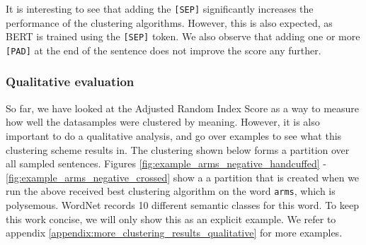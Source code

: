 \documentclass[a4paper,12pt,oneside,openright]{report}
\begin{document}
It is interesting to see that adding the \Verb#[SEP]# significantly increases the performance of the clustering algorithms.
However, this is also expected, as BERT is trained using the \Verb#[SEP]# token.
We also observe that adding one or more \Verb#[PAD]# at the end of the sentence does not improve the score any further. \\

\subsubsection{Qualitative evaluation}

So far, we have looked at the Adjusted Random Index Score as a way to measure how well the datasamples were clustered by meaning.
However, it is also important to do a qualitative analysis, and go over examples to see what this clustering scheme results in.
The clustering shown below forms a partition over all sampled sentences.
Figures \ref{fig:example_arms_negative_handcuffed} - \ref{fig:example_arms_negative_crossed} show a a partition that is created when we run the above received best clustering algorithm on the word \Verb#arms#, which is polysemous. 
WordNet records 10 different semantic classes for this word.
To keep this work concise, we will only show this as an explicit example. 
We refer to appendix \ref{appendix:more_clustering_results_qualitative} for more examples.
\\

\begin{tcolorbox}
\label{fig:example_arms_negative_handcuffed}
\end{tcolorbox}
\end{document}
